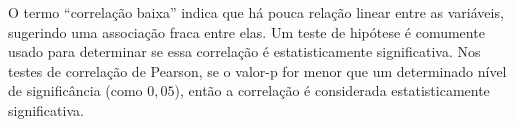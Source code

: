 O termo ``correlação baixa'' indica que há pouca relação linear entre as variáveis, sugerindo uma associação fraca entre elas. Um teste de hipótese é comumente usado para determinar se essa correlação é estatisticamente significativa. Nos testes de correlação de Pearson, se o valor-p for menor que um determinado nível de significância (como $0,05$), então a correlação é considerada estatisticamente significativa.


%
%
%
%
